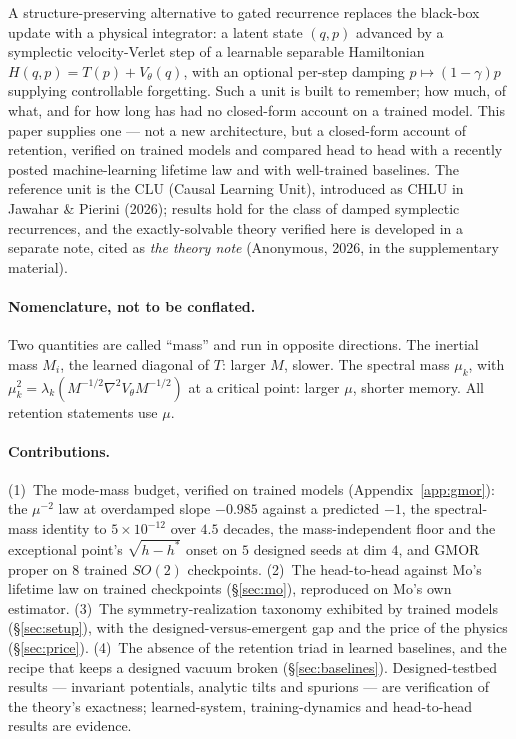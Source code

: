 \documentclass{article}
\begin{document}
A structure-preserving alternative to gated recurrence replaces the black-box update with a physical integrator: a latent state $(q,p)$ advanced by a symplectic velocity-Verlet step of a learnable separable Hamiltonian $H(q,p)=T(p)+V_\theta(q)$, with an optional per-step damping $p\mapsto(1-\gamma)p$ supplying controllable forgetting. Such a unit is built to remember; how much, of what, and for how long has had no closed-form account on a trained model. This paper supplies one --- not a new architecture, but a closed-form account of retention, verified on trained models and compared head to head with a recently posted machine-learning lifetime law and with well-trained baselines. The reference unit is the CLU (Causal Learning Unit), introduced as CHLU in Jawahar \& Pierini (2026); results hold for the class of damped symplectic recurrences, and the exactly-solvable theory verified here is developed in a separate note, cited as \emph{the theory note} (Anonymous, 2026, in the supplementary material).

\paragraph{Nomenclature, not to be conflated.} Two quantities are called ``mass'' and run in opposite directions. The inertial mass $M_i$, the learned diagonal of $T$: larger $M$, slower. The spectral mass $\mu_k$, with $\mu_k^2=\lambda_k(M^{-1/2}\nabla^2V_\theta M^{-1/2})$ at a critical point: larger $\mu$, shorter memory. All retention statements use $\mu$.

\paragraph{Contributions.} (1)~The mode-mass budget, verified on trained models (Appendix~\ref{app:gmor}): the $\mu^{-2}$ law at overdamped slope $-0.985$ against a predicted $-1$, the spectral-mass identity to $5\!\times\!10^{-12}$ over $4.5$ decades, the mass-independent floor and the exceptional point's $\sqrt{h-h^*}$ onset on $5$ designed seeds at dim $4$, and GMOR proper on $8$ trained $SO(2)$ checkpoints. (2)~The head-to-head against Mo's lifetime law on trained checkpoints (\S\ref{sec:mo}), reproduced on Mo's own estimator. (3)~The symmetry-realization taxonomy exhibited by trained models (\S\ref{sec:setup}), with the designed-versus-emergent gap and the price of the physics (\S\ref{sec:price}). (4)~The absence of the retention triad in learned baselines, and the recipe that keeps a designed vacuum broken (\S\ref{sec:baselines}). Designed-testbed results --- invariant potentials, analytic tilts and spurions --- are verification of the theory's exactness; learned-system, training-dynamics and head-to-head results are evidence.
\end{document}
